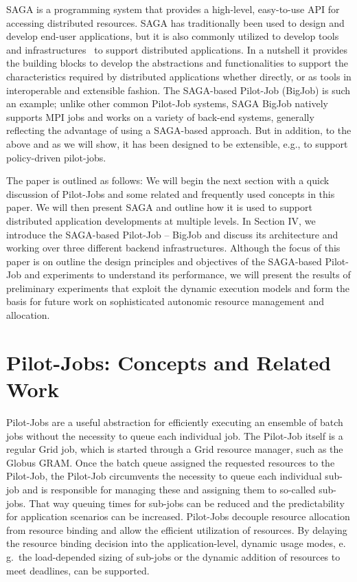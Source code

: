 \documentclass[conference,final]{IEEEtran}
\newcommand{\up}{\vspace*{-1em}}
\newcommand{\alnote}[1]{ {\textcolor{blue} { ***AL: #1 }}}
\newcommand{\jhanote}[1]{ {\textcolor{red} { ***SJ: #1 }}}
\newcommand{\alnote}[1]{}
\newcommand{\jhanote}[1]{}
\begin{document}
SAGA is a programming system that provides a high-level, easy-to-use
API for accessing distributed resources.  SAGA has traditionally been
used to design and develop end-user applications, but it is also
commonly utilized to develop tools and
infrastructures~\cite{saga-tools} to support distributed
applications. In a nutshell it provides the building blocks to develop
the abstractions and functionalities to support the characteristics
required by distributed applications whether directly, or as tools in
interoperable and extensible fashion.  The SAGA-based Pilot-Job
(BigJob) is such an example; unlike other common Pilot-Job systems,
SAGA BigJob natively supports MPI jobs and works on a variety of
back-end systems, generally reflecting the advantage of using a
SAGA-based approach. But in addition, to the above and as we will
show, it has been designed to be extensible, e.g., to support
policy-driven pilot-jobs.


The paper is outlined as follows: We will begin the next section with
a quick discussion of Pilot-Jobs and some related and frequently used
concepts in this paper. We will then present SAGA and outline how it
is used to support distributed application developments at multiple
levels. In Section IV, we introduce the SAGA-based Pilot-Job -- BigJob
and discuss its architecture and working over three different backend
infrastructures. Although the focus of this paper is on outline the
design principles and objectives of the SAGA-based Pilot-Job and
experiments to understand its performance, we will present the results
of preliminary experiments that exploit the dynamic execution models
and form the basis for future work on sophisticated autonomic resource
management and allocation.

\up
\section{Pilot-Jobs: Concepts and Related Work} %
\up

Pilot-Jobs are a useful abstraction for efficiently executing an
ensemble of batch jobs without the necessity to queue each individual
job.  The Pilot-Job itself is a regular Grid job, which is started
through a Grid resource manager, such as the Globus GRAM.  Once the
batch queue assigned the requested resources to the Pilot-Job, the
Pilot-Job circumvents the necessity to queue each individual sub-job
and is responsible for managing these and assigning them to so-called
sub-jobs. That way queuing times for sub-jobs can be reduced and the
predictability for application scenarios can be increased.  Pilot-Jobs
decouple resource allocation from resource binding and allow the
efficient utilization of resources. By delaying the resource binding
decision into the application-level, dynamic usage modes, e.\,g.\ the
load-depended sizing of sub-jobs or the dynamic addition of resources
to meet deadlines, can be supported.
\end{document}
